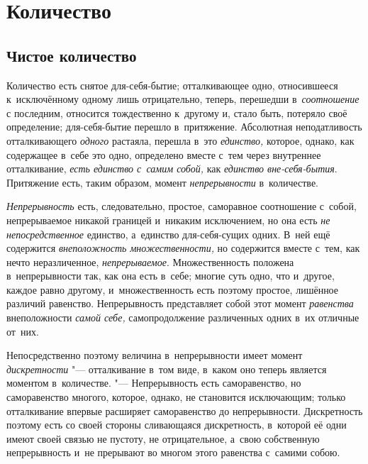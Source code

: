 \section{Количество}

\subsection{Чистое количество}

Количество есть снятое для-себя-бытие; отталкивающее одно, относившееся
к~исключённому одному лишь отрицательно, теперь, перешедши в~{\em соотношение}
с последним, относится тождественно к~другому и, стало быть, потеряло своё
определение; для-себя-бытие перешло в~притяжение. Абсолютная неподатливость
отталкивающего {\em одного} растаяла, перешла в~это {\em единство,} которое,
однако, как содержащее в~себе это одно, определено вместе с~тем через
внутреннее отталкивание, {\em есть единство с~самим собой,} как
{\em единство вне-себя-бытия}. Притяжение есть, таким образом, момент
{\em непрерывности} в~количестве.

{\em Непрерывность} есть, следовательно, простое, саморавное соотношение
с~собой, непрерываемое никакой границей и~никаким исключением, но она есть
{\em не непосредственное} единство, а~единство для-себя-сущих одних. В~ней
ещё содержится {\em внеположность множественности,} но содержится вместе
с~тем, как нечто неразличенное, {\em непрерываемое}. Множественность положена
в~непрерывности так, как она есть в~себе; многие суть одно, что и~другое,
каждое равно другому, и~множественность есть поэтому простое, лишённое
различий равенство. Непрерывность представляет собой этот момент
{\em равенства} внеположности {\em самой себе,} самопродолжение различенных
одних в~их отличные от~них.

Непосредственно поэтому величина в~непрерывности имеет момент
{\em дискретности} "--- отталкивание в~том виде, в~каком оно теперь является
моментом в~количестве. "--- Непрерывность есть саморавенство, но саморавенство
многого, которое, однако, не становится исключающим; только отталкивание
впервые расширяет саморавенство до непрерывности. Дискретность поэтому есть
со своей стороны сливающаяся дискретность, в~которой её одни имеют своей связью
не пустоту, не отрицательное, а~свою собственную непрерывность и~не прерывают
во многом этого равенства с~самими собою.

